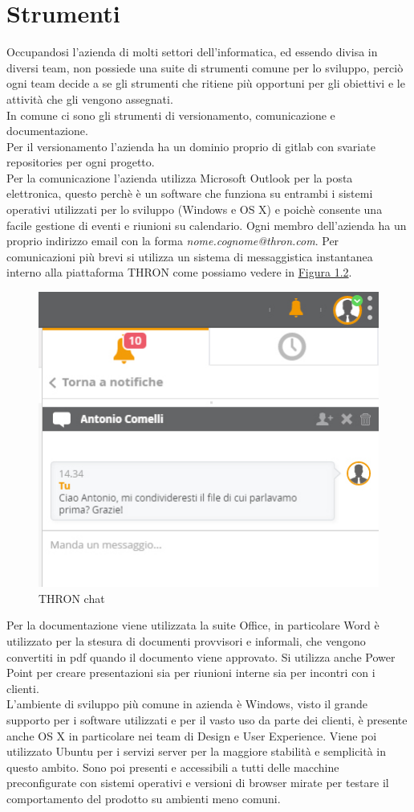 \documentclass[a4paper, 12pt, twoside, openright]{book}
\begin{document}
\newpage{}
\section{Strumenti}
Occupandosi l'azienda di molti settori dell'informatica, ed essendo divisa in diversi team, non possiede una suite di strumenti comune per lo sviluppo, perciò ogni team decide a se gli strumenti che ritiene più opportuni per gli obiettivi e le attività che gli vengono assegnati.\\
In comune ci sono gli strumenti di versionamento, comunicazione e documentazione.\\
Per il versionamento l'azienda ha un dominio proprio di gitlab con svariate repositories per ogni progetto.\\
Per la comunicazione l'azienda utilizza Microsoft Outlook per la posta elettronica, questo perchè è un software che funziona su entrambi i sistemi operativi utilizzati per lo sviluppo (Windows e OS X) e poichè consente una facile gestione di eventi e riunioni su calendario. Ogni membro dell'azienda ha un proprio indirizzo email con la forma \textit{nome.cognome@thron.com}. Per comunicazioni più brevi si utilizza un sistema di messaggistica instantanea interno alla piattaforma THRON come possiamo vedere in \hyperref[esempio-chat]{Figura 1.2}.
\begin{figure}[H]
	\centering
	\label{esempio-chat}
	\includegraphics[scale=0.5]{images/esempio-chat.jpg}
	\caption{THRON chat}
\end{figure}
Per la documentazione viene utilizzata la suite Office, in particolare Word è utilizzato per la stesura di documenti provvisori e informali, che vengono convertiti in pdf quando il documento viene approvato. Si utilizza anche Power Point per creare presentazioni sia per riunioni interne sia per incontri con i clienti.\\
L'ambiente di sviluppo più comune in azienda è Windows, visto il grande supporto per i software utilizzati e per il vasto uso da parte dei clienti, è presente anche OS X in particolare nei team di Design e User Experience. Viene poi utilizzato Ubuntu per i servizi server per la maggiore stabilità e semplicità in questo ambito. Sono poi presenti e accessibili a tutti delle macchine preconfigurate con sistemi operativi e versioni di browser mirate per testare il comportamento del prodotto su ambienti meno comuni.
\end{document}
